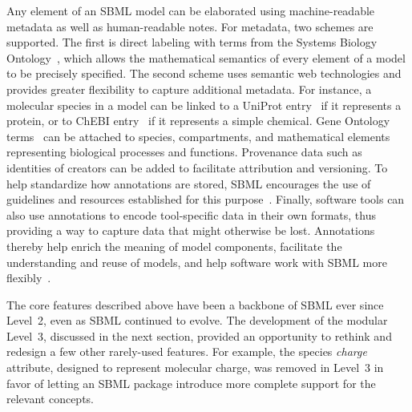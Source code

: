 \documentclass{sbml-paper}
\begin{document}
Any element of an SBML model can be elaborated using machine-readable metadata as well as human-readable notes.  For metadata, two schemes are supported.  The first is direct labeling with terms from the Systems Biology Ontology~\citep[SBO;][]{courtot2011controlled}, which allows the mathematical semantics of every element of a model to be precisely specified.  The second scheme uses semantic web technologies and provides greater flexibility to capture additional metadata.  For instance, a molecular species in a model can be linked to a UniProt entry~\citep{uniprot2017} if it represents a protein, or to ChEBI entry~\citep{hastings2013chebi} if it represents a simple chemical.  Gene Ontology terms~\citep[GO;][]{ashburner2000gene} can be attached to species, compartments, and mathematical elements representing biological processes and functions.  Provenance data such as identities of creators can be added to facilitate attribution and versioning.  To help standardize how annotations are stored, SBML encourages the use of guidelines and resources established for this purpose~\citep{le_novere_2005}.  Finally, software tools can also use annotations to encode tool-specific data in their own formats, thus providing a way to capture data that might otherwise be lost.  Annotations thereby help enrich the meaning of model components, facilitate the understanding and reuse of models, and help software work with SBML more flexibly~\citep{Neal2019harmonizing}.

The core features described above have been a backbone of SBML ever since Level~2, even as SBML continued to evolve.  The development of the modular Level~3, discussed in the next section, provided an opportunity to rethink and redesign a few other rarely-used features.  For example, the species \emph{charge} attribute, designed to represent molecular charge, was removed in Level~3 in favor of letting an SBML package introduce more complete support for the relevant concepts.
\end{document}

